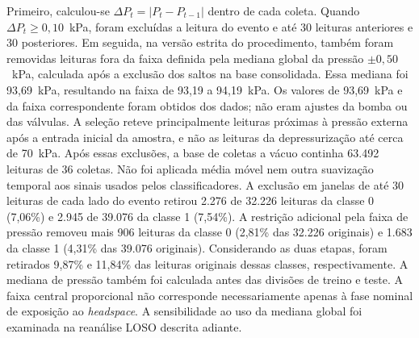 Primeiro, calculou-se
$\Delta P_t=|P_t-P_{t-1}|$ dentro de cada coleta. Quando
$\Delta P_t\geq 0{,}10$~kPa, foram excluídas a leitura do evento e até
30 leituras anteriores e 30 posteriores. Em seguida, na versão estrita
do procedimento, também foram removidas leituras fora da faixa definida
pela mediana global da pressão $\pm 0{,}50$~kPa, calculada após a exclusão
dos saltos na base
consolidada. Essa mediana foi 93,69~kPa, resultando na faixa de
93,19 a 94,19~kPa. Os valores de 93,69~kPa e da faixa correspondente
foram obtidos dos dados; não eram ajustes da bomba ou das válvulas. A
seleção reteve principalmente leituras próximas à pressão externa após
a entrada inicial da amostra, e não as leituras da depressurização até
cerca de 70~kPa. Após essas exclusões, a base de coletas a vácuo continha
63.492 leituras de 36 coletas. Não foi aplicada média móvel nem outra suavização temporal
aos sinais usados pelos classificadores.
A exclusão em janelas de até 30 leituras de cada lado do evento retirou
2.276 de 32.226 leituras da classe 0 (7,06\%) e 2.945 de 39.076 da
classe 1 (7,54\%). A restrição adicional pela faixa de pressão removeu
mais 906 leituras da classe 0 (2,81\% das 32.226 originais) e 1.683 da
classe 1 (4,31\% das 39.076 originais). Considerando as duas
etapas, foram retirados 9,87\% e 11,84\% das leituras originais dessas
classes, respectivamente.
A mediana de pressão também foi calculada antes das divisões de treino e
teste. A faixa central proporcional não corresponde necessariamente apenas
à fase nominal de exposição ao \textit{headspace}. A sensibilidade ao uso
da mediana global foi examinada na reanálise LOSO descrita adiante.

